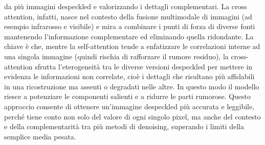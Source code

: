 da più immagini despeckled e valorizzando i dettagli complementari.
La cross attention, infatti, nasce nel contesto della fusione multimodale di immagini 
(ad esempio infrarosso e visibile) e mira a combinare i punti di forza di diverse fonti 
mantenendo l’informazione complementare ed eliminando quella ridondante.
La chiave è che, mentre la self-attention tende a enfatizzare le correlazioni interne ad 
una singola immagine (quindi rischia di rafforzare il rumore residuo), la cross-attention 
sfrutta l’eterogeneità tra le diverse versioni despeckled per mettere in evidenza le 
informazioni non correlate, cioè i dettagli che risultano più affidabili in una ricostruzione 
ma assenti o degradati nelle altre. In questo modo il modello riesce a potenziare le componenti 
salienti e a ridurre le parti rumorose. Questo approccio consente di ottenere un’immagine despeckled più accurata e leggibile, perché 
tiene conto non solo del valore di ogni singolo pixel, ma anche del contesto e della complementarità 
tra più metodi di denoising, superando i limiti della semplice media pesata.

\medskip

